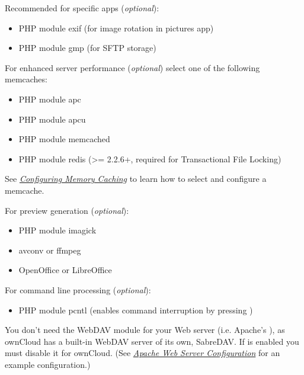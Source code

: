 \documentclass[letterpaper,10pt,english]{sphinxmanual}
\begin{document}
Recommended for specific apps (\emph{optional}):
\begin{itemize}
\item {} 
PHP module exif (for image rotation in pictures app)

\item {} 
PHP module gmp (for SFTP storage)

\end{itemize}

For enhanced server performance (\emph{optional}) select one of the following
memcaches:
\begin{itemize}
\item {} 
PHP module apc

\item {} 
PHP module apcu

\item {} 
PHP module memcached

\item {} 
PHP module redis (\textgreater{}= 2.2.6+, required for Transactional File Locking)

\end{itemize}

See {\hyperref[configuration_server/caching_configuration::doc]{\emph{Configuring Memory Caching}}} to learn how to select
and configure a memcache.

For preview generation (\emph{optional}):
\begin{itemize}
\item {} 
PHP module imagick

\item {} 
avconv or ffmpeg

\item {} 
OpenOffice or LibreOffice

\end{itemize}

For command line processing (\emph{optional}):
\begin{itemize}
\item {} 
PHP module pcntl (enables command interruption by pressing )

\end{itemize}

You don’t need the WebDAV module for your Web server (i.e. Apache’s
), as ownCloud has a built-in WebDAV server of its own, SabreDAV.
If  is enabled you must disable it for ownCloud. (See
{\hyperref[installation/source_installation:apache-configuration-label]{\emph{Apache Web Server Configuration}}} for an example configuration.)
\end{document}

